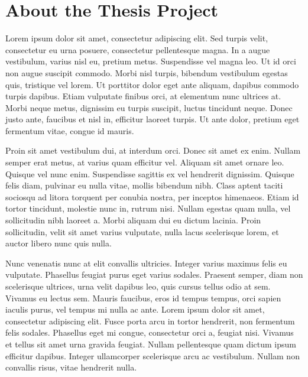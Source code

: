 \documentclass[
10pt, %
a4paper, %
oneside, %
headinclude,footinclude, %
]{article}
\begin{document}
\let\thefootnote\relax{}


\newpage %


\section{About the Thesis Project}
Lorem ipsum dolor sit amet, consectetur adipiscing elit. Sed turpis velit, consectetur eu urna posuere, consectetur pellentesque magna. In a augue vestibulum, varius nisl eu, pretium metus. Suspendisse vel magna leo. Ut id orci non augue suscipit commodo. Morbi nisl turpis, bibendum vestibulum egestas quis, tristique vel lorem. Ut porttitor dolor eget ante aliquam, dapibus commodo turpis dapibus. Etiam vulputate finibus orci, at elementum nunc ultrices at. Morbi neque metus, dignissim eu turpis suscipit, luctus tincidunt neque. Donec justo ante, faucibus et nisl in, efficitur laoreet turpis. Ut ante dolor, pretium eget fermentum vitae, congue id mauris.

Proin sit amet vestibulum dui, at interdum orci. Donec sit amet ex enim. Nullam semper erat metus, at varius quam efficitur vel. Aliquam sit amet ornare leo. Quisque vel nunc enim. Suspendisse sagittis ex vel hendrerit dignissim. Quisque felis diam, pulvinar eu nulla vitae, mollis bibendum nibh. Class aptent taciti sociosqu ad litora torquent per conubia nostra, per inceptos himenaeos. Etiam id tortor tincidunt, molestie nunc in, rutrum nisi. Nullam egestas quam nulla, vel sollicitudin nibh laoreet a. Morbi aliquam dui eu dictum lacinia. Proin sollicitudin, velit sit amet varius vulputate, nulla lacus scelerisque lorem, et auctor libero nunc quis nulla.

Nunc venenatis nunc at elit convallis ultricies. Integer varius maximus felis eu vulputate. Phasellus feugiat purus eget varius sodales. Praesent semper, diam non scelerisque ultrices, urna velit dapibus leo, quis cursus tellus odio at sem. Vivamus eu lectus sem. Mauris faucibus, eros id tempus tempus, orci sapien iaculis purus, vel tempus mi nulla ac ante. Lorem ipsum dolor sit amet, consectetur adipiscing elit. Fusce porta arcu in tortor hendrerit, non fermentum felis sodales. Phasellus eget mi congue, consectetur orci a, feugiat nisi. Vivamus et tellus sit amet urna gravida feugiat. Nullam pellentesque quam dictum ipsum efficitur dapibus. Integer ullamcorper scelerisque arcu ac vestibulum. Nullam non convallis risus, vitae hendrerit nulla.
\end{document}
